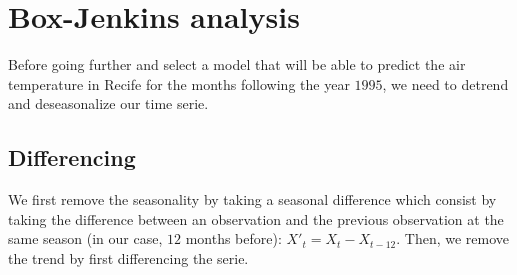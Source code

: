 \section{Box-Jenkins analysis} 

Before going further and select a model that will be able to predict the air temperature in Recife for the months following the year $1995$, we need to detrend and deseasonalize our time serie. 


\subsection{Differencing}

We first remove the seasonality by taking a seasonal difference which consist by taking the difference between an observation and the previous observation at the same season (in our case, $12$ months before): $X'_t = X_t - X_{t-12}$. 
Then, we remove the trend by first differencing the serie.

